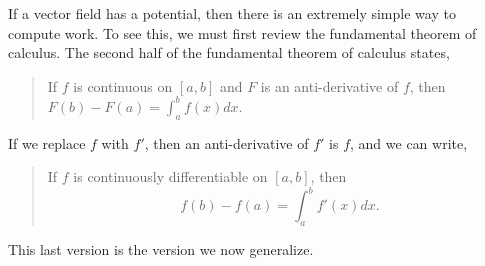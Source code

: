 \documentclass[10pt,]{book}
\theoremstyle{plain}
\theoremstyle{definition}
\theoremstyle{definition}
\theoremstyle{definition}
\theoremstyle{definition}
\theoremstyle{definition}
\numberwithin{equation}{section}
\begin{document}
If a vector field has a potential, then there is an extremely simple way to compute work. To see this, we must first review the fundamental theorem of calculus. The second half of the fundamental theorem of calculus states,%
\begin{quote}\hypertarget{blockquote-5}{}
If \(f\) is continuous on \([a,b]\) and \(F\) is an anti-derivative of \(f\), then \(F(b)-F(a) = \int_a^b f(x) dx\).%
\end{quote}
If we replace \(f\) with \(f'\), then an anti-derivative of \(f'\) is \(f\), and we can write,%
\begin{quote}\hypertarget{blockquote-6}{}
If \(f\) is continuously differentiable on \([a,b]\), then%
\begin{equation*}
f(b)-f(a)=\int_a^b f'(x) dx.
\end{equation*}
%
\end{quote}
This last version is the version we now generalize.%
\typeout{************************************************}
\typeout{************************************************}
\end{document}
